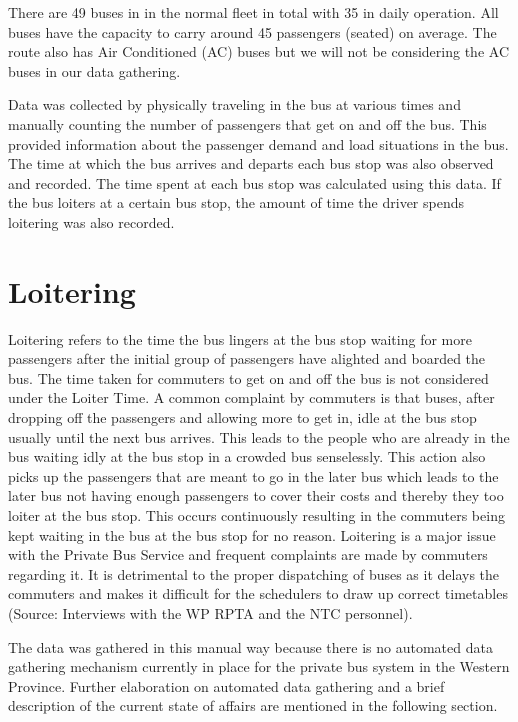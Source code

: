 \documentclass[12pt, oneside]{report}
\begin{document}
There are 49 buses in in the normal fleet in total with 35 in daily operation. All buses have the capacity to carry around 45 passengers (seated) on average. The route also has Air Conditioned (AC) buses but we will not be considering the AC buses in our data gathering.

Data was collected by physically traveling in the bus at various times and manually counting the number of passengers that get on and off the bus. This provided information about the passenger demand and load situations in the bus. The time at which the bus arrives and departs each bus stop was also observed and recorded. The time spent at each bus stop was calculated using this data. If the bus loiters at a certain bus stop, the amount of time the driver spends loitering was also recorded.

\section{Loitering} Loitering refers to the time the bus lingers at the bus stop waiting for more passengers after the initial group of passengers have alighted and boarded the bus. The time taken for commuters to get on and off the bus is not considered under the Loiter Time. A common complaint by commuters is that buses, after dropping off the passengers and allowing more to get in, idle at the bus stop usually until the next bus arrives. This leads to the people who are already in the bus waiting idly at the bus stop in a crowded bus senselessly. This action also picks up the passengers that are meant to go in the later bus which leads to the later bus not having enough passengers to cover their costs and thereby they too loiter at the bus stop. This occurs continuously resulting in the commuters being kept waiting in the bus at the bus stop for no reason. Loitering is a major issue with the Private Bus Service and frequent complaints are made by commuters regarding it. It is detrimental to the proper dispatching of buses as it delays the commuters and makes it difficult for the schedulers to draw up correct timetables (Source: Interviews with the WP RPTA and the NTC personnel).

The data was gathered in this manual way because there is no automated data gathering mechanism currently in place for the private bus system in the Western Province. Further elaboration on automated data gathering and a brief description of the current state of affairs are mentioned in the following section.
\end{document}
